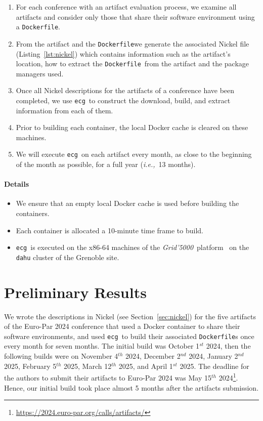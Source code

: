 \documentclass[sigconf,natbib=false]{acmart}
\newcommand{\ie}{\emph{i.e.,}}
\newcommand{\grid}{\emph{Grid'5000}}
\newcommand{\df}{\texttt{Dockerfile}}
\newcommand{\ecg}{\texttt{ecg}}
\begin{document}
\begin{enumerate}
\item For each conference with an artifact evaluation process, we examine all artifacts and consider only those that share their software environment using a \df.
\item From the artifact and the \df we generate the associated Nickel file (Listing~\ref{lst:nickel}) which contains information such as the artifact's location, how to extract the \df\ from the artifact and the package managers used. 
\item Once all Nickel descriptions for the artifacts of a conference have been completed, we use \ecg\ to construct the download, build, and extract information from each of them.
\item Prior to building each container, the local Docker cache is cleared on these machines.
\item We will execute \ecg\ on each artifact every month, as close to the beginning of the month as possible, for a full year (\ie\ 13 months).
\end{enumerate}

\paragraph{Details}

\begin{itemize}
\item We ensure that an empty local Docker cache is used before building the containers.
\item Each container is allocated a 10-minute time frame to build.
\item \ecg\ is executed on the x86-64 machines of the \grid\ platform~\cite{grid5000} on the \texttt{dahu} cluster of the Grenoble site.
\end{itemize}

\section{Preliminary Results}\label{sec:results}

We wrote the descriptions in Nickel (see Section~\ref{sec:nickel}) for the five artifacts of the Euro-Par 2024 conference that used a Docker container to share their software environments, and used \ecg\ to build their associated \df s once every month for seven months.
The initial build was October 1$^{st}$ 2024, then the following builds were on November 4$^{th}$ 2024, December 2$^{nd}$ 2024, January 2$^{nd}$ 2025, February 5$^{th}$ 2025, March 12$^{th}$ 2025, and April 1$^{st}$ 2025.
The deadline for the authors to submit their artifacts to Euro-Par 2024 was May 15$^{th}$ 2024\footnote{\url{https://2024.euro-par.org/calls/artifacts/}}.
Hence, our initial build took place almost 5 months after the artifacts submission.
\end{document}
